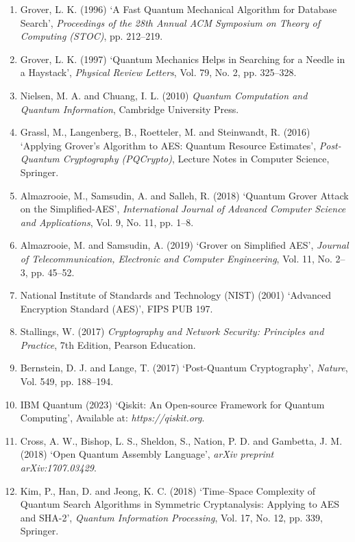 \documentclass[12pt,a4paper]{report}
\begin{document}
\begin{enumerate}

\item Grover, L. K. (1996) ‘A Fast Quantum Mechanical Algorithm for Database Search’,
\textit{Proceedings of the 28th Annual ACM Symposium on Theory of Computing (STOC)},
pp. 212–219.

\item Grover, L. K. (1997) ‘Quantum Mechanics Helps in Searching for a Needle in a Haystack’,
\textit{Physical Review Letters}, Vol. 79, No. 2, pp. 325–328.

\item Nielsen, M. A. and Chuang, I. L. (2010)
\textit{Quantum Computation and Quantum Information},
Cambridge University Press.

\item Grassl, M., Langenberg, B., Roetteler, M. and Steinwandt, R. (2016)
‘Applying Grover’s Algorithm to AES: Quantum Resource Estimates’,
\textit{Post-Quantum Cryptography (PQCrypto)},
Lecture Notes in Computer Science, Springer.

\item Almazrooie, M., Samsudin, A. and Salleh, R. (2018)
‘Quantum Grover Attack on the Simplified-AES’,
\textit{International Journal of Advanced Computer Science and Applications},
Vol. 9, No. 11, pp. 1–8.

\item Almazrooie, M. and Samsudin, A. (2019)
‘Grover on Simplified AES’,
\textit{Journal of Telecommunication, Electronic and Computer Engineering},
Vol. 11, No. 2–3, pp. 45–52.

\item National Institute of Standards and Technology (NIST) (2001)
‘Advanced Encryption Standard (AES)’,
FIPS PUB 197.

\item Stallings, W. (2017)
\textit{Cryptography and Network Security: Principles and Practice},
7th Edition, Pearson Education.

\item Bernstein, D. J. and Lange, T. (2017)
‘Post-Quantum Cryptography’,
\textit{Nature}, Vol. 549, pp. 188–194.

\item IBM Quantum (2023)
‘Qiskit: An Open-source Framework for Quantum Computing’,
Available at: \textit{https://qiskit.org}.

\item Cross, A. W., Bishop, L. S., Sheldon, S., Nation, P. D. and Gambetta, J. M. (2018)
‘Open Quantum Assembly Language’,
\textit{arXiv preprint arXiv:1707.03429}.

\item Kim, P., Han, D. and Jeong, K. C. (2018)
‘Time--Space Complexity of Quantum Search Algorithms in Symmetric Cryptanalysis: Applying to AES and SHA-2’,
\textit{Quantum Information Processing},
Vol. 17, No. 12, pp. 339,
Springer.


\end{enumerate}
\end{document}
